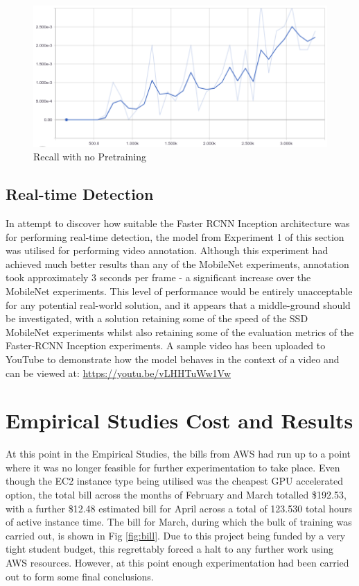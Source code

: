 \documentclass[12pt]{report}
\begin{document}
\vspace{0.5cm}
\begin{figure}[ht!]
	\centering
	\includegraphics[width=15cm]{no-ckpt-recall}
	\caption{Recall with no Pretraining}
	\label{fig:no-ckpt-recall}
\end{figure}

\clearpage
\subsection{Real-time Detection}
\begin{flushleft}
In attempt to discover how suitable the Faster RCNN Inception architecture was for performing real-time detection, the model from Experiment 1 of this section was utilised for performing video annotation. Although this experiment had achieved much better results than any of the MobileNet experiments, annotation took approximately 3 seconds per frame - a significant increase over the MobileNet experiments. This level of performance would be entirely unacceptable for any potential real-world solution, and it appears that a middle-ground should be investigated, with a solution retaining some of the speed of the SSD MobileNet experiments whilst also retaining some of the evaluation metrics of the Faster-RCNN Inception experiments. A sample video has been uploaded to YouTube to demonstrate how the model behaves in the context of a video and can be viewed at: \href{https://youtu.be/vLHHTuWw1Vw}{https://youtu.be/vLHHTuWw1Vw}
\end{flushleft}

\newpage
\newpage
\section{Empirical Studies Cost and Results}
\begin{flushleft}
At this point in the Empirical Studies, the bills from AWS had run up to a point where it was no longer feasible for further experimentation to take place. Even though the EC2 instance type being utilised was the cheapest GPU accelerated option, the total bill across the months of February and March totalled \$192.53, with a further \$12.48 estimated bill for April across a total of 123.530 total hours of active instance time. The bill for March, during which the bulk of training was carried out, is shown in Fig \ref{fig:bill}. Due to this project being funded by a very tight student budget, this regrettably forced a halt to any further work using AWS resources. However, at this point enough experimentation had been carried out to form some final conclusions.
\end{flushleft}
\end{document}
